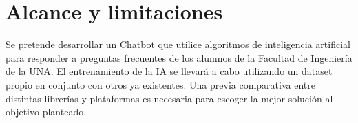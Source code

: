 \section{Alcance y limitaciones}
Se pretende desarrollar un Chatbot que utilice algoritmos de inteligencia artificial para responder a preguntas
frecuentes de los alumnos de la Facultad de Ingeniería de la UNA. El entrenamiento de la IA se
llevará a cabo utilizando un dataset propio en conjunto con otros ya existentes.
Una previa comparativa entre distintas librerías y plataformas es necesaria para escoger la mejor
solución al objetivo planteado.
